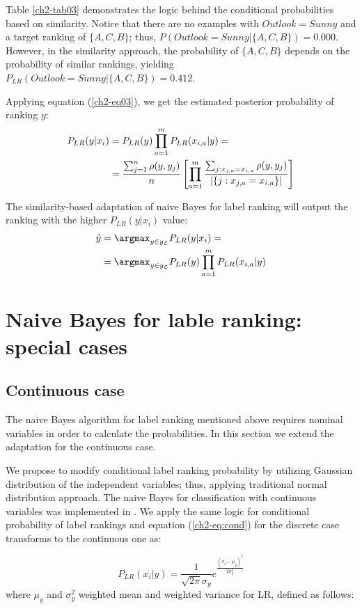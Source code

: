 Table \ref{ch2-tab03} demonstrates the logic behind the conditional probabilities based on similarity. Notice that there are no examples with $Outlook=Sunny$ and a target ranking of $\{A,C,B\}$; thus, $P(Outlook=Sunny|\{A,C,B\})=0.000$. However, in the similarity approach, the probability of $\{A,C,B\}$ depends on the probability of similar rankings, yielding $P_{LR}(Outlook=Sunny|\{A,C,B\})=0.412$.


Applying equation (\ref{ch2-eq03}), we get the estimated posterior probability of ranking $y$:
\begin{align}
P_{LR}(y|x_i)&=P_{LR}(y)\prod_{a=1}^m P_{LR}(x_{i,a}|y)=\\ \notag
& =\frac{\sum_{j=1}^{n} \rho(y,y_j)}{n}\left [ \prod_{a=1}^{m} \frac{\sum_{j: x_{j,a} = x_{i,a}}\rho(y, y_j)}{|\{j: x_{j,a} = x_{i,a}\}|}\right ]
\end{align}

The similarity-based adaptation of naive Bayes for label ranking will output the ranking with the higher $P_{LR}(y|x_i)$ value:
\begin{align}
\hat{y}&=\argmax_{y \in y_{\mathcal{L}} }P_{LR}(y|x_i)= \\ \notag
&=\argmax_{y \in y_{\mathcal{L}} }P_{LR}(y)\prod_{a=1}^m P_{LR}(x_{i,a}|y)
\end{align}

\section{Naive Bayes for lable ranking: special cases}
\label{ch2-sec:cases}
\subsection{Continuous case}
\label{ch2-sec:nbr.cont}
The naive Bayes algorithm for label ranking mentioned above requires nominal variables in order to calculate the probabilities. In this section we extend the adaptation for the continuous case.

We propose to modify conditional label ranking probability  by utilizing Gaussian distribution of the independent variables; thus, applying traditional normal distribution approach. The naive Bayes for classification with continuous variables was implemented  in \cite{bouckaert2005}.  We apply the same logic for  conditional  probability of label rankings and equation (\ref{ch2-eq:cond}) for the discrete case transforms to the continuous one as:

\begin{equation}
\label{ch2-cont}
P_{LR}(x_{i}|y)=\frac{1}{\sqrt{2\pi}\sigma_y}e^\frac{(x_i-\mu_y)^2}{2\sigma_y^2}
\end{equation}
where $\mu_y$ and $\sigma_y^2$ weighted  mean and weighted variance for LR, defined as follows:

